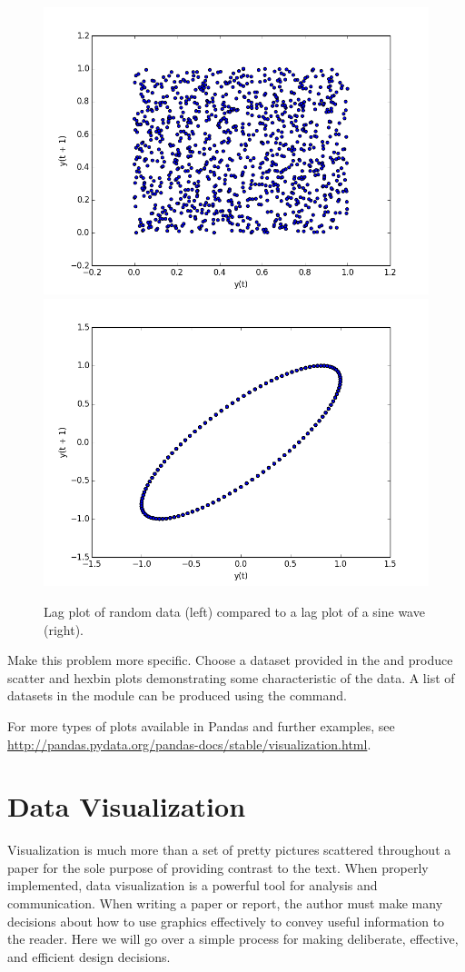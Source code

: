 \begin{figure}[H]
    \centering
    \includegraphics[width=.49\textwidth]{randomdata.png}
    \includegraphics[width=.49\textwidth]{structureddata.png}
    \caption{Lag plot of random data (left) compared to a lag plot of a sine wave (right).}
\end{figure}


\begin{problem}
Make this problem more specific.
Choose a dataset provided in the  and produce scatter and hexbin plots demonstrating some characteristic of the data. A list of datasets in the  module can be produced using the  command.
\end{problem}

For more types of plots available in Pandas and further examples, see \url{http://pandas.pydata.org/pandas-docs/stable/visualization.html}.

\section*{Data Visualization}

Visualization is much more than a set of pretty pictures scattered throughout a paper for the sole purpose of providing contrast to the text.
When properly implemented, data visualization is a powerful tool for analysis and communication. 
When writing a paper or report, the author must make many decisions about how to use graphics effectively to convey useful information to the reader.  Here we will go over a simple process for making deliberate, effective, and efficient design decisions.

